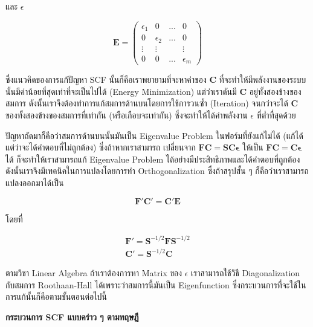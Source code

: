 \noindent และ $\epsilon$

\begin{equation}
  \bm{E}
  =
  \left( \begin{matrix} \epsilon_1 & 0          & ... & 0            \\
               0          & \epsilon_2 & ... & 0            \\
               \vdots     & \vdots     &     & \vdots       \\
               0          & 0          & ... & \epsilon_{m}
    \end{matrix} \right)
\end{equation}

ซึ่งแนวคิดของการแก้ปัญหา SCF นั้นก็คือเราพยายามที่จะหาค่าของ $\bm{C}$ ที่จะทำให้มีพลังงานของระบบนั้นมีค่าน้อยที่สุดเท่าที่จะเป็นไปได้
(Energy Minimization) แต่ว่าเราดันมี $\bm{C}$ อยู่ทั้งสองข้างของสมการ ดังนั้นเราจึงต้องทำการแก้สมการด้านบนโดยการใช้การวนซ้ำ
(Iteration) จนกว่าจะได้ $\bm{C}$ ของทั้งสองข้างของสมการที่เท่ากัน (หรือเกือบจะเท่ากัน) ซึ่งจะทำให้ได้ค่าพลังงาน $\epsilon$ ที่ต่ำที่สุดด้วย

ปัญหาถัดมาก็คือว่าสมการด้านบนนั้นมันเป็น Eigenvalue Problem ในฟอร์มที่ยังแก้ไม่ได้ (แก้ได้แต่ว่าจะได้คำตอบที่ไม่ถูกต้อง) ซึ่งถ้าหากเราสามารถ%
เปลี่ยนจาก $\bm{FC} = \bm{SC \epsilon}$ ให้เป็น $\bm{FC} = \bm{C \epsilon}$ ได้ ก็จะทำให้เราสามารถแก้ Eigenvalue Problem
ได้อย่างมีประสิทธิภาพและได้คำตอบที่ถูกต้อง ดังนั้นเราจึงมีเทคนิคในการแปลงโดยการทำ Orthogonalization ซึ่งถ้าสรุปสั้น ๆ ก็คือว่าเราสามารถ%
แปลงออกมาได้เป็น

\begin{equation}
  \bm{F'C'} = \bm{C'E}
\end{equation}

\noindent โดยที่

\begin{gather}
  \bm{F'} = \bm{S}^{-1/2}\bm{F}\bm{S}^{-1/2} \\
  \bm{C'} = \bm{S}^{-1/2}\boldsymbol{C}
\end{gather}

\noindent ตามวิชา Linear Algebra ถ้าเราต้องการหา Matrix ของ $\epsilon$ เราสามารถใช้วิธี Diagonalization
กับสมการ Roothaan-Hall ได้เพราะว่าสมการนี้มันเป็น Eigenfunction ซึ่งกระบวนการที่จะใช้ในการแก้นั้นก็คือตามขั้นตอนต่อไปนี้

\noindent \textbf{กระบวนการ SCF แบบคร่าว ๆ ตามทฤษฎี}

